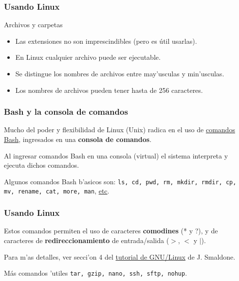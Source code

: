 \documentclass[hyperref={colorlinks}]{beamer}
\begin{document}
\begin{frame}\frametitle{Usando Linux}
\begin{block}{Archivos y carpetas}
\begin{itemize}
\item Las extensiones no son imprescindibles (pero es útil usarlas).
\item En Linux cualquier archivo puede ser ejecutable.
\item Se distingue los nombres de archivos entre may'usculas y min'usculas.
\item Los nombres de archivos pueden tener hasta de 256 caracteres.
\end{itemize}
\end{block}
\end{frame}


\begin{frame}\frametitle{Bash y la consola de comandos}
\begin{block}{}
Mucho del poder y flexibilidad de Linux (Unix) radica en el uso de \href{https://es.wikipedia.org/wiki/Comandos_Bash}{comandos Bash}, ingresados en una \textbf{consola de comandos}.

Al ingresar comandos Bash en una consola (virtual) el sistema interpreta y ejecuta dichos comandos.
\end{block}
\begin{block}{}
Algunos comandos Bash b'asicos son: \texttt{ls, cd, pwd, rm, mkdir, rmdir, cp, mv, rename, cat, more, man}, \href{https://es.wikipedia.org/wiki/Comandos_Bash}{etc}.
\end{block}
\end{frame}

\begin{frame}\frametitle{Usando Linux}
\begin{block}{}
Estos comandos permiten el uso de caracteres \textbf{comodines} (* y ?), y de caracteres de \textbf{redireccionamiento} de entrada/salida ($>$, $<$ y $|$).
\end{block}

\begin{block}{}
Para m'as detalles, ver secci'on 4 del \href{http://www.smaldone.com.ar/documentos/misdocumentos.shtml}{tutorial de GNU/Linux} de J. Smaldone.
\end{block}

\begin{block}{M\'as comandos 'utiles}
\texttt{tar, gzip, nano, ssh, sftp, nohup}.
\end{block}
\end{frame}
\end{document}

